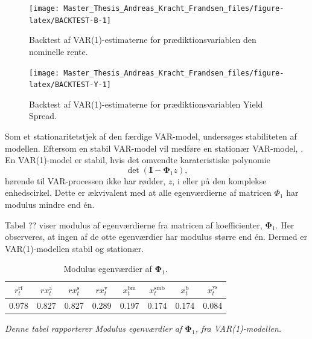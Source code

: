 \documentclass[
  a4paper,
  oneside]{memoir}
\begin{document}
\begin{figure}[H]

{\centering \texttt{[image: Master\_Thesis\_Andreas\_Kracht\_Frandsen\_files/figure-latex/BACKTEST-B-1]} 

}

\caption{Backtest af VAR(1)-estimaterne for prædiktionsvariablen den nominelle rente.}\label{fig:BACKTEST-B}
\end{figure}

\begin{figure}[H]

{\centering \texttt{[image: Master\_Thesis\_Andreas\_Kracht\_Frandsen\_files/figure-latex/BACKTEST-Y-1]} 

}

\caption{Backtest af VAR(1)-estimaterne for prædiktionsvariablen Yield Spread.}\label{fig:BACKTEST-Y}
\end{figure}

Som et stationaritetstjek af den færdige VAR-model, undersøges stabiliteten af modellen. Eftersom en stabil VAR-model vil medføre en stationær VAR-model, \citep{Lutkepohl2005}. En VAR(1)-model er stabil, hvis det omvendte karateristiske polynomie
\[\det\left(\bm{I} - \bm{\Phi}_1 z\right),\]
hørende til VAR-processen ikke har rødder, \(z\), i eller på den komplekse enhedscirkel. Dette er ækvivalent med at alle egenværdierne af matricen \(\Phi_1\) har modulus mindre end én.

Tabel ?? viser modulus af egenværdierne fra matricen af koefficienter, \(\bm{\Phi}_1\). Her observeres, at ingen af de otte egenværdier har modulus større end én. Dermed er VAR(1)-modellen stabil og stationær.

\begin{table}[H]

\caption{\label{tab:ROOTS-VAR}Modulus egenværdier af $\bm{\Phi}_1$.}
\centering
\begin{threeparttable}
\begin{tabular}[t]{cccccccc}
\toprule
$r_t^{\text{rf}}$ & $rx_t^{\text{a}}$ & $rx_t^{\text{s}}$ & $rx_t^{\text{v}}$ & $x_t^{\text{bm}}$ & $x_t^{\text{smb}}$ & $x_t^{\text{b}}$ & $x_t^{\text{ys}}$\\
\midrule
\rowcolor{gray!6}  0.978 & 0.827 & 0.827 & 0.289 & 0.197 & 0.174 & 0.174 & 0.084\\
\bottomrule
\end{tabular}
\begin{tablenotes}
\item \textit{Denne tabel rapporterer Modulus egenværdier af $\bm{\Phi}_1$, fra VAR(1)-modellen.}
\end{tablenotes}
\end{threeparttable}
\end{table}
\end{document}
